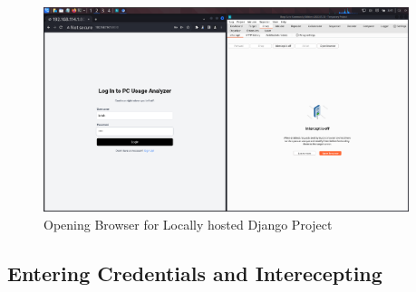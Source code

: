 \documentclass[11pt]{article}
\begin{document}
\begin{figure}[H]
    \centering
    \includegraphics[width=0.95\textwidth]{burpsuite (2).png}
    \caption{Opening Browser for Locally hosted Django Project}
    \label{fig:1}
\end{figure}
\subsection{Entering Credentials and Interecepting}



\end{document}
